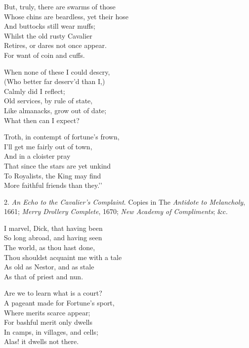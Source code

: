 \begin{dcverse}
\begin{patverse}
But, truly, there are swarms of those\\
Whose chins are beardless, yet their hose\\
And buttocks still wear muffs;\\
Whilst the old rusty Cavalier\\
Retires, or dares not once appear.\\
For want of coin and cuffs.
\end{patverse}

\begin{patverse}
When none of these I could descry,\\
(Who better far deserv’d than I,)\\
Calmly did I reflect;\\
Old services, by rule of state,\\
Like almanacks, grow out of date;\\
What then can I expect?
\end{patverse}

\begin{patverse}
Troth, in contempt of fortune’s frown,\\
I’ll get me fairly out of town,\\
And in a cloister pray\\
That since the stars are yet unkind\\
To Royalists, the King may find\\
More faithful friends than they.’’
\end{patverse}
\end{dcverse}

2. \textit{An Echo to the Cavalier’s Complaint}. Copies in The \textit{Antidote to Melancholy},
1661; \textit{Merry Drollery Complete}, 1670; \textit{New Academy of Compliments}; \&c.

\begin{dcverse}
\begin{patverse}
I marvel, Dick, that having been\\
So long abroad, and having seen\\
The world, as thou hast done,\\
Thou shouldst acquaint me with a tale\\
As old as Nestor, and as stale\\
As that of priest and nun.
\end{patverse}

\begin{patverse}
Are we to learn what is a court?\\
A pageant made for Fortune’s sport,\\
Where merits scarce appear;\\
For bashful merit only dwells\\
In camps, in villages, and cells;\\
Alas! it dwells not there.
\end{patverse}
\end{dcverse}
\pagebreak

